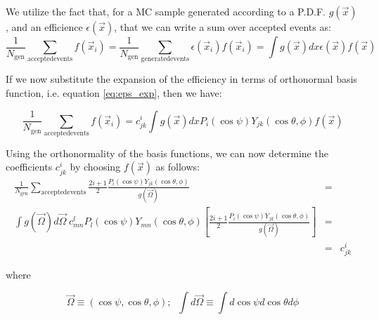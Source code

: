 \documentclass[a4paper,9pt,twoside]{article}
\begin{document}
We utilize the fact that, for a MC sample generated according to a P.D.F. $g(\vec{x})$,
and an efficience $\epsilon(\vec{x})$, that we can write a sum over accepted events as:
\begin{equation}
  \frac{1}{N_{\mathrm{gen}}} \sum_{\mathrm{accepted events}} f(\vec{x}_i) = \frac{1}{N_{\mathrm{gen}}} \sum_{\mathrm{generated events}} \epsilon(\vec{x}_i) f(\vec{x}_i) =  \int g(\vec{x})dx \epsilon(\vec{x}) f(\vec{x})
\end{equation}

If we now substitute the expansion of the efficiency in terms of orthonormal basis function,
i.e. equation \ref{eq:eps_exp}, then we have:

\begin{equation}
  \frac{1}{N_{\mathrm{gen}}} \sum_{\mathrm{accepted events}} f(\vec{x}_i) = c^i_{jk}  \int g(\vec{x})dx P_i(\cos\psi)Y_{jk}(\cos\theta,\phi)  f(\vec{x})
\end{equation}

Using the orthonormality of the basis functions, we can now determine the coefficients $c^i_{jk}$ 
by  choosing $f(\vec{x})$ as follows:
\begin{eqnarray}
\frac{1}{N_{\mathrm{gen}}} \sum_{\mathrm{accepted events}} \frac{2i+1}{2}\frac{ P_i(\cos\psi)Y_{jk}(\cos\theta,\phi) }{ g(\vec{\Omega}) }  &=&\\
    \int g(\vec{\Omega})d\vec{\Omega}\; c^l_{mn} P_l(\cos\psi)Y_{mn}(\cos\theta,\phi) \left[  \frac{2i+1}{2}\frac{ P_i(\cos\psi)Y_{jk}(\cos\theta,\phi) }{ g(\vec{\Omega}) } \right] &=&\\
    &=& c^i_{jk}
\end{eqnarray}

where

\begin{equation}
\vec{\Omega} \equiv (\cos\psi,\cos\theta,\phi);\;\; \int d\vec{\Omega} \equiv \int d\cos\psi d\cos\theta d\phi
\end{equation}
\end{document}
